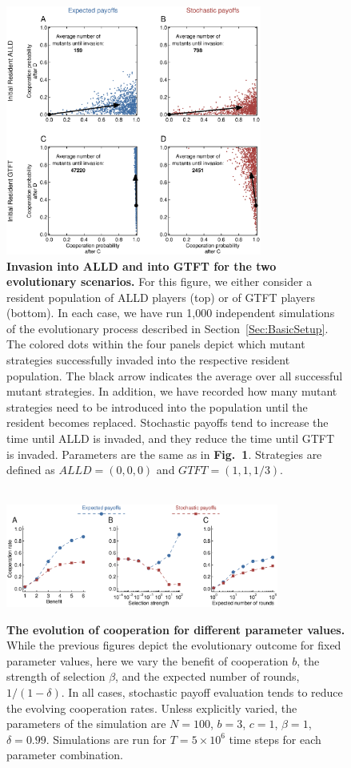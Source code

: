 \documentclass[11pt]{article}
\newcommand{\FigEvoProc}{{\bf Fig.~1}}
\theoremstyle{plainCl1}
\theoremstyle{plainCl2}
\begin{document}
\begin{figure}[t!]
\centering
\includegraphics[width=0.75\textwidth]{Fig2} ~\\[-0.6cm]
\caption{{\bf Invasion into ALLD and into GTFT for the two evolutionary scenarios.} 
For this figure, we either consider a resident population of ALLD players (top) or of GTFT players (bottom). In each case, we have run 1,000 independent simulations of the evolutionary process described in Section~\ref{Sec:BasicSetup}. The colored dots within the four panels depict which mutant strategies successfully invaded into the respective resident population. The black arrow indicates the average over all successful mutant strategies. In addition, we have recorded how many mutant strategies need to be introduced into the population until the resident becomes replaced. Stochastic payoffs tend to increase the time until ALLD is invaded, and they reduce the time until GTFT is invaded. Parameters are the same as in \FigEvoProc. Strategies are defined as $ALLD\!=\!(0,0,0)$ and $GTFT=(1,1,1/3)$.}
~\\[0.4cm]
\includegraphics[width=0.8\textwidth]{Fig3} 
\caption{{\bf The evolution of cooperation for different parameter values.} 
While the previous figures depict the evolutionary outcome for fixed parameter values, here we vary the benefit of cooperation $b$, the strength of selection $\beta$, and the expected number of rounds, $1/(1\!-\!\delta)$. In all cases, stochastic payoff evaluation tends to reduce the evolving cooperation rates. Unless explicitly varied, the parameters of the simulation are $N\!=\!100$, $b\!=\!3$, $c\!=\!1$, $\beta\!=\!1$, $\delta\!=\!0.99$. Simulations are run for $T\!=\!5\times 10^6$ time steps for each parameter combination.}
\end{figure}
\end{document}

